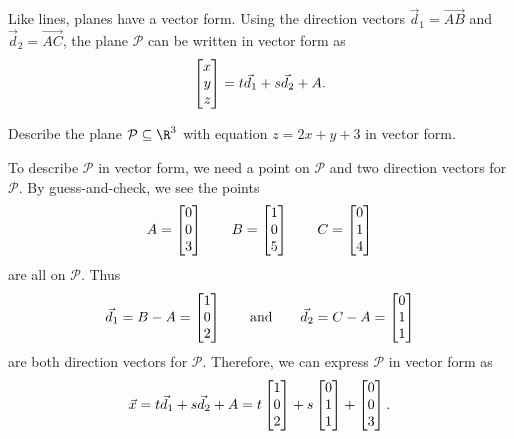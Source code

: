 Like lines, planes have a vector form.  Using the direction vectors $\vec d_1=\overrightarrow{AB}$ and 
$\vec d_2=\overrightarrow{AC}$,
the plane $\mathcal P$ can be written in vector form as
\[
	\mat{x\\y\\z} = t\vec d_1+s\vec d_2+A.
\]
\begin{center}
\end{center}


\begin{example}
	Describe the plane $\mathcal P\subseteq \R^3$ with equation $z=2x+y+3$ in vector form.

	To describe $\mathcal P$ in vector form, we need a point on $\mathcal P$ and two direction
	vectors for $\mathcal P$. By guess-and-check, we see the points
	\[
		A=\mat{0\\0\\3}\qquad B=\mat{1\\0\\5}\qquad C=\mat{0\\1\\4}
	\]
	are all on $\mathcal P$. Thus
	\[
		\vec d_1=B-A=\mat{1\\0\\2}\qquad \text{and}\qquad
		\vec d_2=C-A=\mat{0\\1\\1}
	\]
	are both direction vectors for $\mathcal P$.  Therefore, we can express $\mathcal P$ in vector
	form as
	\[
		\vec x=t\vec d_1+s\vec d_2+A=t\mat{1\\0\\2}+s\mat{0\\1\\1}+\mat{0\\0\\3}.
	\]
\end{example}


